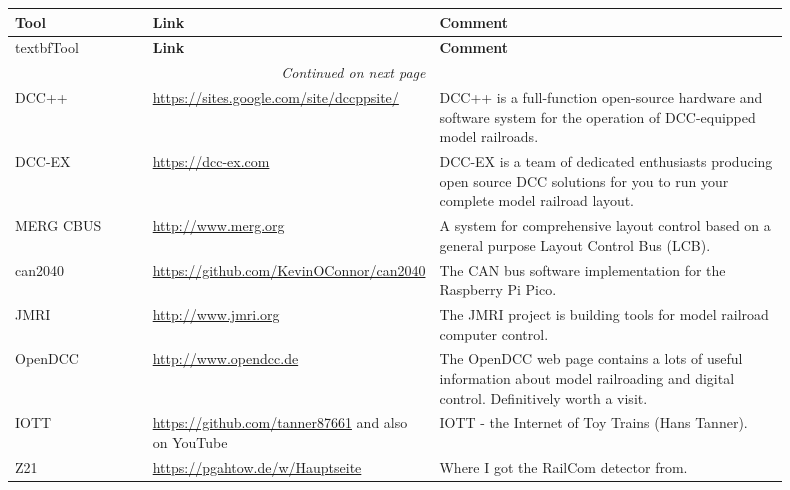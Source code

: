 \begin{longtable}{|p{0.18\linewidth}|p{0.26\linewidth}|p{0.46\linewidth}|}
    \toprule
    \textbf{Tool} & \textbf{Link} & \textbf{Comment} \\
    \midrule
    \endfirsthead
    \toprule
    textbf{Tool} & \textbf{Link} & \textbf{Comment} \\
    \midrule
    \endhead
    \midrule
    \multicolumn{2}{r}{\textit{Continued on next page}} \\
    \midrule
    \endfoot
    \bottomrule
    \endlastfoot
	DCC++ & \url{https://sites.google.com/site/dccppsite/} & DCC++ is a full-function open-source hardware and software system for the operation of DCC-equipped model railroads. \\
	\midrule
	DCC-EX & \url{https://dcc-ex.com} & DCC-EX is a team of dedicated enthusiasts producing open source DCC solutions for you to run your complete model railroad layout. \\
	\midrule
	MERG CBUS & \url{http://www.merg.org} & A system for comprehensive layout control based on a general purpose Layout Control Bus (LCB). \\
	\midrule
	can2040 & \url{https://github.com/KevinOConnor/can2040} & The CAN bus software implementation for the Raspberry Pi Pico. \\
	\midrule
	JMRI & \url{http://www.jmri.org} & The JMRI project is building tools for model railroad computer control. \\
	\midrule
	OpenDCC & \url{http://www.opendcc.de} & The OpenDCC web page contains a lots of useful information about model railroading and digital control. Definitively worth a visit. \\
	\midrule
	IOTT & \url{https://github.com/tanner87661} and also on YouTube & IOTT - the Internet of Toy Trains (Hans Tanner). \\
	\midrule
	Z21 & \url{https://pgahtow.de/w/Hauptseite} & Where I got the RailCom detector from. \\
\end{longtable}


